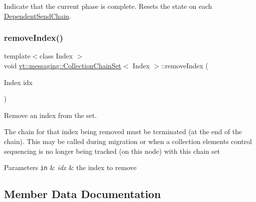 Indicate that the current phase is complete. Resets the state on each {\ttfamily \hyperlink{classvt_1_1messaging_1_1_dependent_send_chain}{Dependent\+Send\+Chain}}. 

\mbox{\label{classvt_1_1messaging_1_1_collection_chain_set_a299e52c482aba47bcdabe796d236c043}} 
\subsubsection{\texorpdfstring{remove\+Index()}{removeIndex()}}
{\footnotesize\ttfamily template$<$class Index $>$ \\
void \hyperlink{classvt_1_1messaging_1_1_collection_chain_set}{vt\+::messaging\+::\+Collection\+Chain\+Set}$<$ Index $>$\+::remove\+Index (\begin{DoxyParamCaption}\item[{Index}]{idx }\end{DoxyParamCaption})\hspace{0.3cm}{\ttfamily [inline]}}



Remove an index from the set. 

The chain for that index being removed must be terminated (at the end of the chain). This may be called during migration or when a collection element\textquotesingle{}s control sequencing is no longer being tracked (on this node) with this chain set


\begin{DoxyParams}[1]{Parameters}
\mbox{\tt in}  & {\em idx} & the index to remove \\
\hline
\end{DoxyParams}


\subsection{Member Data Documentation}
\mbox{\label{classvt_1_1messaging_1_1_collection_chain_set_afd05e48d93d231320364149fd538beab}} 
